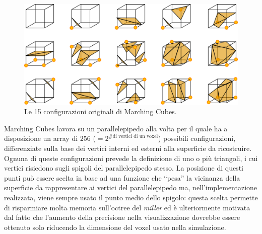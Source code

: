 \begin{figure}[htp]
	\centering
	\includegraphics[width=.75\textwidth]{img/mcpolys}
	\caption{Le 15 configurazioni originali di Marching Cubes.}
	\label{fig:mcpolys}
\end{figure}

Marching Cubes lavora su un parallelepipedo alla volta per il quale ha a disposizione un array di $256$ ($ = 2^{\text{\# di vertici di un voxel}}$) possibili configurazioni, differenziate sulla base dei vertici interni ed esterni alla superficie da ricostruire. Ognuna di queste configurazioni prevede la definizione di uno o più triangoli, i cui vertici risiedono sugli spigoli del parallelepipedo stesso. La posizione di questi punti può essere scelta in base ad una funzione che ``pesa'' la vicinanza della superficie da rappresentare ai vertici del parallelepipedo ma, nell'implementazione realizzata, viene sempre usato il punto medio dello spigolo: questa scelta permette di risparmiare molta memoria sull'octree del \emph{miller} ed è ulteriormente motivata dal fatto che l'aumento della precisione nella visualizzazione dovrebbe essere ottenuto solo riducendo la dimensione del voxel usato nella simulazione.

